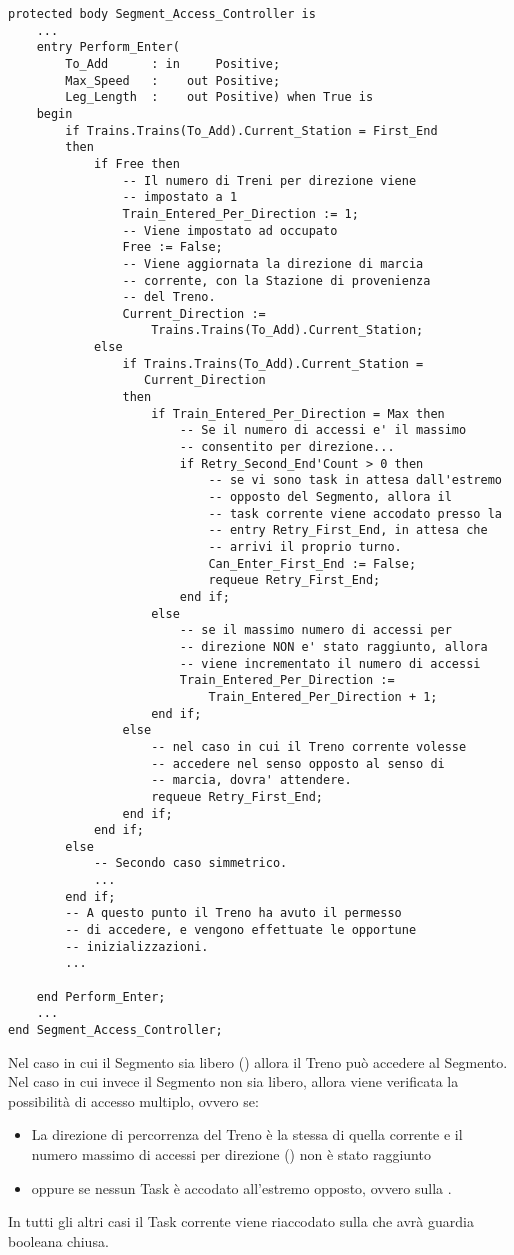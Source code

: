 \begin{lstlisting}[caption=\small{Porzione della \ii{entry} \ttt{Perform\_Enter} per l'accesso dall'estremo \ttt{First\_End}},label=code:segment_monitor_perform_enter]
protected body Segment_Access_Controller is
	...
	entry Perform_Enter(
		To_Add      : in     Positive;
		Max_Speed   :    out Positive;
		Leg_Length  :    out Positive) when True is
	begin
		if Trains.Trains(To_Add).Current_Station = First_End 
		then
			if Free then
				-- Il numero di Treni per direzione viene 
				-- impostato a 1
				Train_Entered_Per_Direction := 1;
				-- Viene impostato ad occupato
				Free := False;
				-- Viene aggiornata la direzione di marcia
				-- corrente, con la Stazione di provenienza 
				-- del Treno.
				Current_Direction := 
					Trains.Trains(To_Add).Current_Station;
			else
				if Trains.Trains(To_Add).Current_Station = 
				   Current_Direction 
				then
					if Train_Entered_Per_Direction = Max then
						-- Se il numero di accessi e' il massimo 
						-- consentito per direzione...
						if Retry_Second_End'Count > 0 then
							-- se vi sono task in attesa dall'estremo
							-- opposto del Segmento, allora il
							-- task corrente viene accodato presso la 
							-- entry Retry_First_End, in attesa che 
							-- arrivi il proprio turno.
							Can_Enter_First_End := False;
							requeue Retry_First_End;
						end if;
					else
						-- se il massimo numero di accessi per 
						-- direzione NON e' stato raggiunto, allora
						-- viene incrementato il numero di accessi
						Train_Entered_Per_Direction := 
							Train_Entered_Per_Direction + 1;
					end if;
				else
					-- nel caso in cui il Treno corrente volesse 
					-- accedere nel senso opposto al senso di 
					-- marcia, dovra' attendere.
					requeue Retry_First_End;
				end if;
		 	end if;
		else
			-- Secondo caso simmetrico.
			...
		end if;	
		-- A questo punto il Treno ha avuto il permesso
		-- di accedere, e vengono effettuate le opportune
		-- inizializzazioni.
		...
			
	end Perform_Enter;
	...
end Segment_Access_Controller;
\end{lstlisting}

Nel caso in cui il Segmento sia libero () allora il Treno può accedere al Segmento.
Nel caso in cui invece il Segmento non sia libero, allora viene verificata la possibilità di accesso multiplo, ovvero se:
	\begin{itemize}
		\item La direzione di percorrenza del Treno è la stessa di quella corrente e il numero massimo di accessi per direzione () non è stato raggiunto 
		\item oppure se nessun Task è accodato all'estremo opposto, ovvero sulla  . 
	\end{itemize}
In tutti gli altri casi il Task corrente viene riaccodato sulla   che avrà guardia booleana chiusa.

